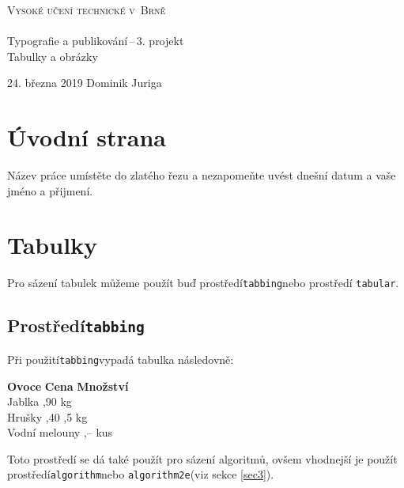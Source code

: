 \documentclass[11pt,a4paper]{article}
\author{Dominik Juriga}
\begin{document}
			\begin{titlepage}
				\begin{center} 
					\textsc{{\Huge Vysoké učení technické v~Brně} \\
					\vspace{0.6em}{\huge Fakulta informačních technologií}}\\
					{\LARGE Typografie a publikování\,--\,3. projekt}\\
					\vspace{0.3em}
					{\Huge Tabulky a obrázky}
				\\
				\end{center}
				{\Large 24. března 2019 \hfill Dominik Juriga}    
			\end{titlepage}
			\section{Úvodní strana}
			Název práce umístěte do zlatého řezu a nezapomeňte uvést dnešní datum a vaše jméno a přijmení.
			
			\section{Tabulky}
			Pro sázení tabulek můžeme použít buď prostředí\enspace\verb|tabbing|\enspace nebo prostředí \verb|tabular|.
		
			\subsection{Prostředí\enspace \texttt{tabbing}}
			Při použití\enspace \verb|tabbing|\enspace vypadá tabulka následovně: 
			
			\begin{tabbing}
				\textbf{Ovoce} \hspace{4em} \= \textbf{Cena} \hspace{1em} \=  \textbf{Množství}\\
				Jablka ,90  kg\\
				Hrušky ,40 ,5 kg\\
				Vodní melouny ,--  kus
			\end{tabbing} \vspace{1em}
			Toto prostředí se dá také použít pro sázení algoritmů, ovšem vhodnejší je použít prostředí\enspace\verb|algorithm|\enspace nebo \enspace\verb|algorithm2e|\enspace (viz sekce \ref{sec3}).
			
\end{document}
